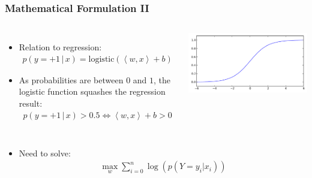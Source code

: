 \begin{frame}
    \frametitle{Mathematical Formulation II}
    \begin{columns}[T]
            \begin{itemize}
                \item Relation to regression:
                    \begin{align*}
                        p(y=+1\,|\, x) = \text{logistic}(\left<w, x\right> + b)
                    \end{align*}
                \item As probabilities are between $0$ and $1$, the logistic function
                    squashes the regression result:
                    \begin{align*}
                         p(y=+1 \,|\, x) > 0.5 \Leftrightarrow \left <w, x \right> + b > 0
                     \end{align*}
            \end{itemize}
            \includegraphics[width=.8\linewidth]{logreg-pics/logistic_sigmoid}\\
    \end{columns}
    \begin{itemize}
        \item Need to solve:
            \begin{align*}
                \max_w \sum_{i=0}^n \log(p(Y=y_i | x_i))
            \end{align*}
    \end{itemize}
\end{frame}


